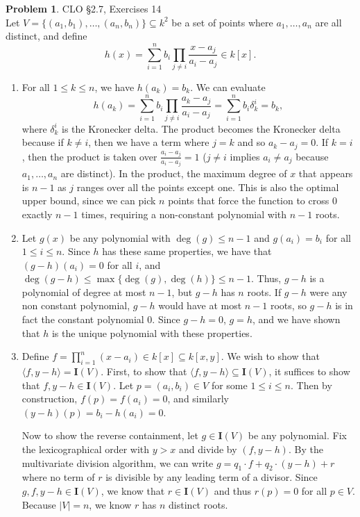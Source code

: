 \documentclass[12pt]{amsart}
\theoremstyle{definition}
\newtheorem{prob}{Problem}
\begin{document}
\begin{flushleft}
\newpage{}
\begin{prob} CLO \S2.7, Exercises 14 \smallskip
 \\
Let $V = \{(a_1,b_1),\dots, (a_n,b_n)\} \subseteq k^2$ be a set of points where $a_1,\dots,a_n$ are all distinct, and define 
\[ h(x)=\sum_{i=1}^n b_i \prod_{j\ne i} \frac{x-a_j}{a_i-a_j} \in k[x]. \]
\begin{enumerate}
    \item[a.] For all $1 \le k \le n$, we have $h(a_k) = b_k$. We can evaluate
    \[h(a_k) = \sum_{i=1}^n b_i \prod_{j \ne i} \frac{a_k - a_j}{a_i - a_j} = \sum_{i=1}^n b_i \delta^i_k = b_k,\]
    where $\delta^i_k$ is the Kronecker delta. The product becomes the Kronecker delta because if $k \ne i$, then we have a term where $j =k$ and so $a_k-a_j = 0$. If $k=i$, then the product is taken over $\frac{a_i-a_j}{a_i-a_j} = 1$ ($j \ne i$ implies $a_i \ne a_j$ because $a_1,\dots,a_n$ are distinct). In the product, the maximum degree of $x$ that appears is $n-1$ as $j$ ranges over all the points except one. This is also the optimal upper bound, since we can pick $n$ points that force the function to cross $0$ exactly $n-1$ times, requiring a non-constant polynomial with $n-1$ roots.
    \item[b.] Let $g(x)$ be any polynomial with $\deg(g)\le n-1$ and $g(a_i)=b_i$ for all $1 \le i \le n$. Since $h$ has these same properties, we have that $(g-h)(a_i)=0$ for all $i$, and $\deg(g-h)\le \max\{\deg(g),\deg(h)\}\le n-1$. Thus, $g-h$ is a polynomial of degree at most $n-1$, but $g-h$ has $n$ roots. If $g-h$ were any non constant polynomial, $g-h$ would have at most $n-1$ roots, so $g-h$ is in fact the constant polynomial $0$. Since $g-h=0$, $g=h$, and we have shown that $h$ is the unique polynomial with these properties.
    \item[c.] Define $f = \prod_{i=1}^n (x-a_i) \in k[x]\subseteq k[x,y]$. We wish to show that $\langle f, y-h\rangle = \mathbf I(V)$. First, to show that $\langle f, y-h\rangle \subseteq \mathbf I(V)$, it suffices to show that $f,y-h\in \mathbf I(V)$. Let $p=(a_i,b_i)\in V$ for some $1 \le i \le n$. Then by construction, $f(p)=f(a_i)=0$, and similarly $(y-h)(p)=b_i-h(a_i)=0$.
    
    Now to show the reverse containment, let $g \in \mathbf I(V)$ be any polynomial. Fix the lexicographical order with $y > x$ and divide by $(f,y-h)$. By the multivariate division algorithm, we can write $g = q_1 \cdot f + q_2 \cdot (y-h) + r$ where no term of $r$ is divisible by any leading term of a divisor. Since $g,f,y-h \in \mathbf I(V)$, we know that $r \in \mathbf I(V)$ and thus $r(p) = 0$ for all $p \in V$. Because $|V| = n$, we know $r$ has $n$ distinct roots. 
    

\end{enumerate}
\end{prob}
\end{flushleft}
\end{document}
